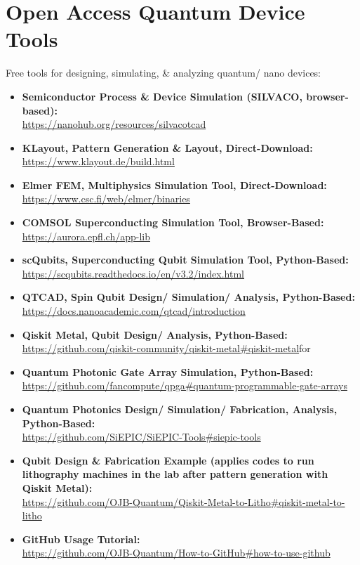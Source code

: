 \chapter{\LARGE{Open Access Quantum Device Tools}}

\begin{flushleft}
\large Free tools for designing, simulating, \& analyzing quantum/ nano devices:
\end{flushleft}

\normalsize\begin{itemize}

  \item\textbf{Semiconductor Process \& Device Simulation (SILVACO, browser-based):}\\
\url{https://nanohub.org/resources/silvacotcad}
  \item\textbf{KLayout, Pattern Generation \& Layout, Direct-Download:}\\
\url{https://www.klayout.de/build.html}
  \item\textbf{Elmer FEM, Multiphysics Simulation Tool, Direct-Download:}\\
\url{https://www.csc.fi/web/elmer/binaries}
  \item\textbf{COMSOL Superconducting Simulation Tool, Browser-Based:}\\
\url{https://aurora.epfl.ch/app-lib}
  \item\textbf{scQubits, Superconducting Qubit Simulation Tool, Python-Based:}\\
\url{https://scqubits.readthedocs.io/en/v3.2/index.html}
  \item\textbf{QTCAD, Spin Qubit Design/ Simulation/ Analysis, Python-Based:}\\
\url{https://docs.nanoacademic.com/qtcad/introduction}
  \item\textbf{Qiskit Metal, Qubit Design/ Analysis, Python-Based:}\\
\url{https://github.com/qiskit-community/qiskit-metal#qiskit-metal}for 
  \item\textbf{Quantum Photonic Gate Array Simulation, Python-Based:}\\
\url{https://github.com/fancompute/qpga#quantum-programmable-gate-arrays}
  \item\textbf{Quantum Photonics Design/ Simulation/ Fabrication, Analysis, Python-Based:}\\
\url{https://github.com/SiEPIC/SiEPIC-Tools#siepic-tools}
  \item\textbf{Qubit Design \& Fabrication Example (applies codes to run lithography machines in the lab after pattern generation with Qiskit Metal):}\\
\url{https://github.com/OJB-Quantum/Qiskit-Metal-to-Litho#qiskit-metal-to-litho}
  \item\textbf{GitHub Usage Tutorial:}\\
\url{https://github.com/OJB-Quantum/How-to-GitHub#how-to-use-github}\\

\end{itemize}